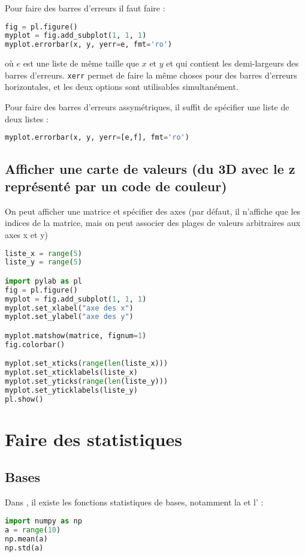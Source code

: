 \documentclass[a4paper,twoside]{article}
\begin{document}
Pour faire des barres d'erreurs il faut faire : 
\begin{lstlisting}[language=python]
fig = pl.figure()
myplot = fig.add_subplot(1, 1, 1)
myplot.errorbar(x, y, yerr=e, fmt='ro')
\end{lstlisting}
où $e$ est une liste de même taille que $x$ et $y$ et qui contient les demi-largeurs des barres d'erreurs. \texttt{xerr} permet de faire la même choses pour des barres d'erreurs horizontales, et les deux options sont utilisables simultanément.

\bigskip

Pour faire des barres d'erreurs assymétriques, il suffit de spécifier une liste de deux listes : 
\begin{lstlisting}[language=python]
myplot.errorbar(x, y, yerr=[e,f], fmt='ro')
\end{lstlisting}

\subsection{Afficher une carte de valeurs (du 3D avec le z représenté par un code de couleur)}
On peut afficher une matrice et spécifier des axes (par défaut, il n'affiche que les indices de la matrice, mais on peut associer des plages de valeurs arbitraires aux axes x et y)

\begin{lstlisting}[language=python]
liste_x = range(5)
liste_y = range(5)

import pylab as pl
fig = pl.figure()
myplot = fig.add_subplot(1, 1, 1)
myplot.set_xlabel("axe des x")
myplot.set_ylabel("axe des y")

myplot.matshow(matrice, fignum=1)
fig.colorbar()

myplot.set_xticks(range(len(liste_x)))
myplot.set_xticklabels(liste_x)
myplot.set_yticks(range(len(liste_y)))
myplot.set_yticklabels(liste_y)
pl.show()
\end{lstlisting}

\section{Faire des statistiques}
\subsection{Bases}
Dans , il existe les fonctions statistiques de bases, notamment la  et l' :
\begin{lstlisting}[language=python]
import numpy as np
a = range(10)
np.mean(a)
np.std(a)
\end{lstlisting}
\end{document}
